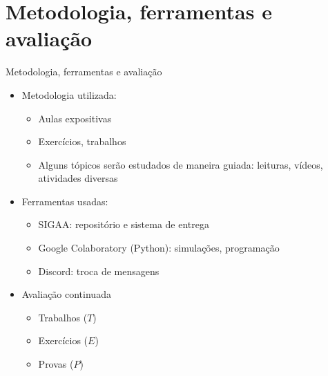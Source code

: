    \section[ slide = true]{Metodologia, ferramentas e avaliação}
      \begin{slide}[toc=]{Metodologia, ferramentas e avaliação}
         \begin{itemize}
		 \item Metodologia utilizada: %
		    \begin{itemize}
		            \item Aulas expositivas
			    \item Exercícios, trabalhos
			    \item Alguns tópicos serão estudados de maneira guiada: leituras, vídeos, atividades diversas
		    \end{itemize}
	    \item Ferramentas usadas:
		    \begin{itemize}
			    \item SIGAA: repositório e sistema de entrega
			    \item Google Colaboratory (Python): simulações, programação 
			    \item Discord: troca de mensagens
		    \end{itemize}

            \item Avaliação continuada
            \begin{itemize}
		    \item Trabalhos ($T$) 
		    \item Exercícios ($E$)
		    \item Provas ($P$)
	    \end{itemize}
	  	 \end{itemize}
      \end{slide}
      
